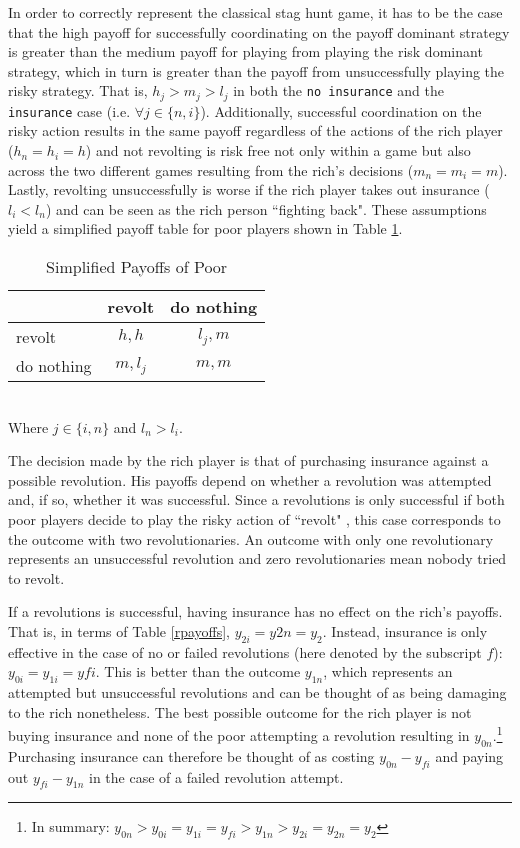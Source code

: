 \documentclass[12pt]{article}
\begin{document}
	In order to correctly represent the classical stag hunt game, it has to be the case that the high payoff for successfully coordinating on the payoff dominant strategy is greater than the medium payoff for playing from playing the risk dominant strategy, which in turn is greater than the payoff from unsuccessfully playing the risky strategy. That is, $h_j > m_j > l_j$ in both the \texttt{no insurance} and the \texttt{insurance} case (i.e. $\forall j\in\{n, i\}$). Additionally, successful coordination on the risky action results in the same payoff regardless of the actions of the rich player ($h_n=h_i=h$) and not revolting is risk free not only within a game but also across the two different games resulting from the rich's decisions ($m_n=m_i=m$). Lastly, revolting unsuccessfully is worse if the rich player takes out insurance ($l_i<l_n$) and can be seen as the rich person ``fighting back". These assumptions yield a simplified payoff table for poor players shown in Table \ref{spayoff}.
	
	\begin{table}[!htbp]
		\caption{Simplified Payoffs of Poor}
		\label{spayoff}
		\centering
		\begin{tabular}{|l|c|c|}
			\hline
			& revolt & do nothing\\
			\hline
			revolt & $h, h$ & $l_j, m$\\
			\hline
			do nothing & $m, l_j$ & $m, m$\\
			\hline
		\end{tabular}\\
		\footnotesize Where $j\in\{i, n\}$ and $l_n>l_i$.
	\end{table}
	
	The decision made by the rich player is that of purchasing insurance against a possible revolution. His payoffs depend on whether a revolution was attempted and, if so, whether it was successful. Since a revolutions is only successful if both poor players decide to play the risky action of ``revolt" , this case corresponds to the outcome with two revolutionaries. An outcome with only one revolutionary represents an unsuccessful revolution and zero revolutionaries mean nobody tried to revolt.
	
	If a revolutions is successful, having insurance has no effect on the rich's payoffs. That is, in terms of Table \ref{rpayoffs}, $y_{2i}=y{2n}=y_2$. Instead, insurance is only effective in the case of no or failed revolutions (here denoted by the subscript $f$): $y_{0i}=y_{1i}=y{fi}$. This is better than the outcome $y_{1n}$, which represents an attempted but unsuccessful revolutions and can be thought of as being damaging to the rich nonetheless. The best possible outcome for the rich player is not buying insurance and none of the poor attempting a revolution resulting in $y_{0n}$.\footnote{In summary: $y_{0n} > y_{0i}=y_{1i}=y_{fi} > y_{1n} > y_{2i}=y_{2n}=y_2$} Purchasing insurance can therefore be thought of as costing $y_{0n}-y_{fi}$ and paying out $y_{fi}-y_{1n}$ in the case of a failed revolution attempt.
	
\end{document}
